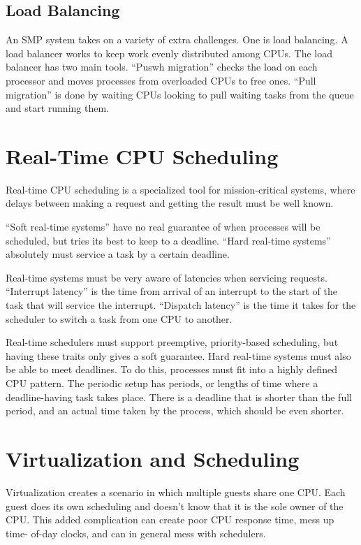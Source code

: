 \documentclass{article}
\begin{document}
\subsection{Load Balancing}
An SMP system takes on a variety of extra challenges. One is load balancing.
A load balancer works to keep work evenly distributed among CPUs. The load
balancer has two main tools. ``Puswh migration'' checks the load on each
processor and moves processes from overloaded CPUs to free ones. ``Pull
migration'' is done by waiting CPUs looking to pull waiting tasks from the
queue and start running them.

\section{Real-Time CPU Scheduling}
Real-time CPU scheduling is a specialized tool for mission-critical systems,
where delays between making a request and getting the result must be well
known.

``Soft real-time systems'' have no real guarantee of when processes will be
scheduled, but tries its best to keep to a deadline. ``Hard real-time systems''
absolutely must service a task by a certain deadline.

Real-time systems must be very aware of latencies when servicing requests.
``Interrupt latency'' is the time from arrival of an interrupt to the start of
the task that will service the interrupt. ``Dispatch latency'' is the time it
takes for the scheduler to switch a task from one CPU to another.

Real-time schedulers must support preemptive, priority-based scheduling, but
having these traits only gives a soft guarantee. Hard real-time systems must
also be able to meet deadlines. To do this, processes must fit into a highly
defined CPU pattern. The periodic setup has periods, or lengths of time where
a deadline-having task takes place. There is a deadline that is shorter than
the full period, and an actual time taken by the process, which should be even
shorter.

\section{Virtualization and Scheduling}
Virtualization creates a scenario in which multiple guests share one CPU. Each
guest does its own scheduling and doesn't know that it is the sole owner of the
CPU. This added complication can create poor CPU response time, mess up time-
of-day clocks, and can in general mess with schedulers.
\end{document}
